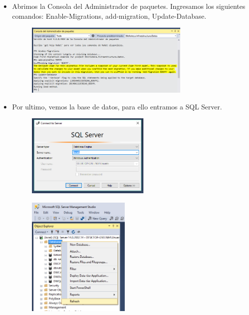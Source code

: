 \documentclass[twoside,twocolumn]{article}
\begin{document}
\begin{itemize}
	\item Abrimos la Consola del Administrador de paquetes. Ingresamos los siguientes comandos: Enable-Migrations, add-migration, Update-Database.\\
\begin{figure}[htb]
\begin{center}
\includegraphics[width=8cm]{./Imagenes/5-1}
\end{center}
\end{figure}
	\item Por ultimo, vemos la base de datos, para ello entramos a SQL Server.
\begin{figure}[htb]
\begin{center}
\includegraphics[width=6cm]{./Imagenes/5}
\end{center}
\end{figure}
\begin{figure}[htb]
\begin{center}
\includegraphics[width=5cm]{./Imagenes/5-2}
\end{center}
\end{figure}
\begin{figure}[htb]
\begin{center}

\end{center}
\end{figure}
\end{itemize}
\end{document}
